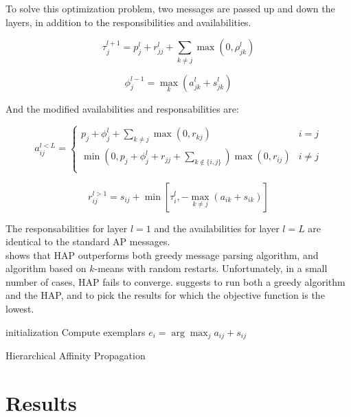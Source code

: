 \documentclass{ipol}
\begin{document}
To solve this optimization problem, two messages are passed up and down the
layers, in addition to the responsibilities and availabilities.

\begin{equation}
\tau_j^{l + 1} = p^l_j + r_{jj}^l + \sum_{k \neq j} \max (0, \rho^l_{jk})
\end{equation}

\begin{equation}
\phi_j^{l - 1} = \max_k (a_{jk}^l + s_{jk}^l)
\end{equation}

And the modified availabilities and responsabilities are:

\begin{equation}
a_{ij}^{l < L} = \begin{cases}
	    p_j + \phi_j^l + \sum_{k \neq j} \max(0, r_{kj}) &  i = j \\
	    \min ( 0, p_j + \phi_j^l + r_{jj} + \sum_{k \notin \{i, j\} } ) \max (0, r_{ij}) & i \neq j\\
	 \end{cases}
\end{equation}

\begin{equation*}
r_{ij}^{l > 1} = s_{ij}  + \min [ \tau_i^l, - \max_{k \neq j} (a_{ik} + s_{ik}) ]
\end{equation*}

The responsabilities for layer $l = 1$ and the availabilities for layer $l =
L$ are identical to the standard AP messages. \\

\cite{hap} shows that HAP outperforms both greedy message parsing algorithm,
and algorithm based on $k$-means with random restarts. Unfortunately, in a
small number of cases, HAP fails to converge. \cite{hap} suggests to run both
a greedy algorithm and the HAP, and to pick the results for which the
objective function is the lowest.

\begin{algorithm}[h]
  \SetLine
  initialization\;
  Compute exemplars $e_i = \arg \max_{j} a_{ij} + s_{ij}$ \;
  \caption{Hierarchical Affinity Propagation}
\end{algorithm}

\section{Results}


\end{document}
